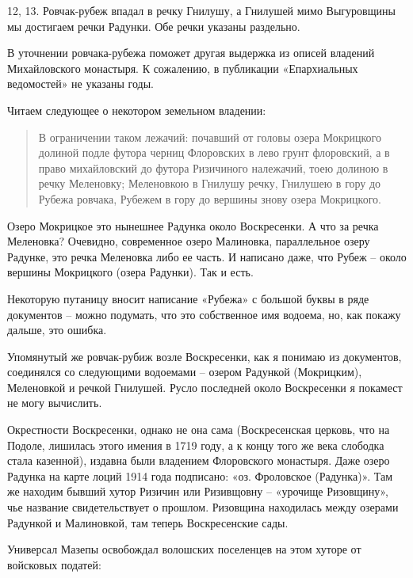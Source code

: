 12, 13. Ровчак-рубеж впадал в речку Гнилушу, а Гнилушей мимо Выгуровщины мы достигаем речки Радунки. Обе речки указаны раздельно. 

В уточнении ровчака-рубежа поможет другая выдержка из описей владений Михайловского монастыря. К сожалению, в публикации «Епархиальных ведомостей» не указаны годы.

Читаем следующее о некотором земельном владении:

\begin{quotation}
В ограничении таком лежачий: почавший от головы озера Мокрицкого долиной подле футора черниц Флоровских в лево грунт флоровский, а в право михайловский до футора Ризичиного належачий, тоею долиною в речку Меленовку; Меленовкою в Гнилушу речку, Гнилушею в гору до Рубежа ровчака, Рубежем в гору до вершины знову озера Мокрицкого.
\end{quotation}

Озеро Мокрицкое это нынешнее Радунка около Воскресенки. А что за речка Меленовка? Очевидно, современное озеро Малиновка, параллельное озеру Радунке, это речка Меленовка либо ее часть. И написано даже, что Рубеж – около вершины Мокрицкого (озера Радунки). Так и есть.

Некоторую путаницу вносит написание «Рубежа» с большой буквы в ряде документов – можно подумать, что это собственное имя водоема, но, как покажу дальше, это ошибка.

Упомянутый же ровчак-рубиж возле Воскресенки, как я понимаю из документов, соединялся со следующими водоемами – озером Радункой (Мокрицким), Меленовкой и речкой Гнилушей. Русло последней около Воскресенки я покамест не могу вычислить.

Окрестности Воскресенки, однако не она сама (Воскресенская церковь, что на Подоле, лишилась этого имения в 1719 году, а к концу того же века слободка стала казенной), издавна были владением Флоровского монастыря. Даже озеро Радунка на карте лоций 1914 года подписано: «оз. Фроловское (Радунка)». Там же находим бывший хутор Ризичин или Ризивщовну – «урочище Ризовщину», чье название свидетельствует о прошлом. Ризовщина находилась между озерами Радункой и Малиновкой, там теперь Воскресенские сады.

Универсал Мазепы освобождал волошских поселенцев на этом хуторе от войсковых податей\cite[96]{mihdocs}: 

